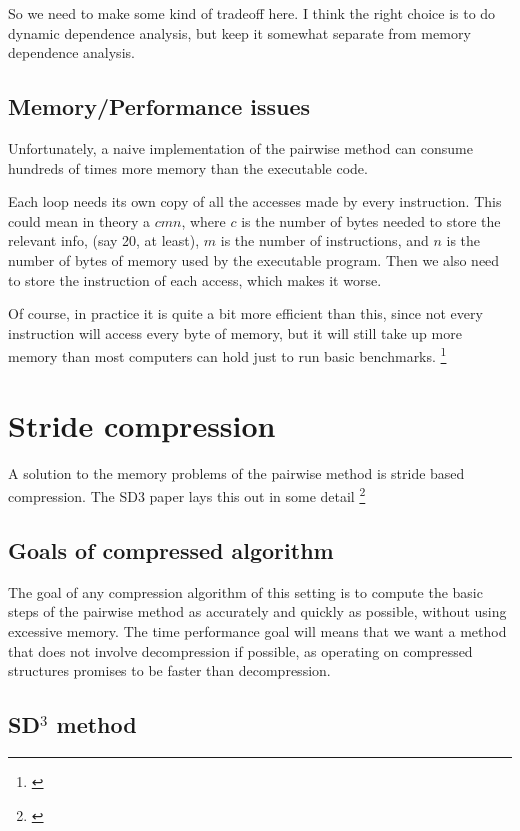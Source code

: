 \documentclass[12pt,twoside]{reedthesis}
\begin{document}
		So we need to make some kind of tradeoff here. I think the right choice is to do dynamic dependence analysis, but keep it somewhat separate from memory dependence analysis. 
		
		
		\subsection{Memory/Performance issues}
		
		Unfortunately, a naive implementation of the pairwise method can consume hundreds of times more memory than the executable code. 
		
		Each loop needs its own copy of all the accesses made by every instruction. This could mean in theory a $cmn$, where $c$ is the number of bytes needed to store the relevant info, (say 20, at least), $m$ is the number of instructions, and $n$ is the number of bytes of memory used by the executable program. Then we also need to store the instruction of each access, which makes it worse. 
		
		Of course, in practice it is quite a bit more efficient than this, since not every instruction will access every byte of memory, but it will still take up more memory than most computers can hold just to run basic benchmarks. \footnote{\cite{Kim:2010}}
		
	\section{Stride compression}

		A solution to the memory problems of the pairwise method is stride based compression. The SD3 paper lays this out in some detail \footnote{\cite{Kim:2010}}
		
		\subsection{Goals of compressed algorithm}
		The goal of any compression algorithm of this setting is to compute the basic steps of the pairwise method as accurately and quickly as possible, without using excessive memory. The time performance goal will means that we want a method that does not involve decompression if possible, as operating on compressed structures promises to be faster than decompression. 
		
		
		\subsection{SD$^3$ method}
		
\end{document}
